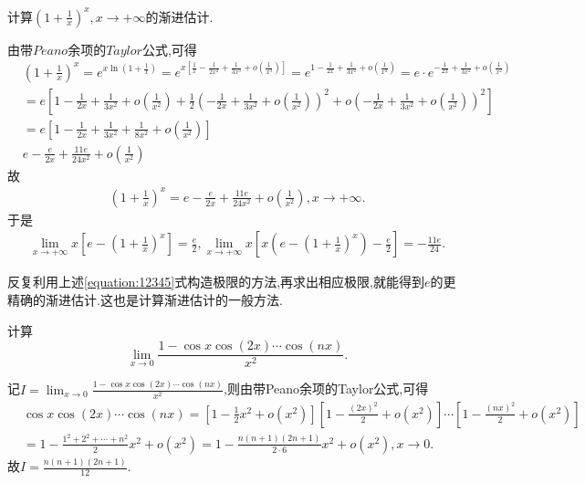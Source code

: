 \documentclass[../../main.tex]{subfiles}
\begin{document}
\begin{example}
计算$(1+\frac{1}{x})^x,x\to+\infty$的渐进估计.
\end{example}
\begin{solution}
由带$Peano$余项的$Taylor$公式,可得
\begin{align*}
&\left( 1+\frac{1}{x} \right) ^x=e^{x\ln \left( 1+\frac{1}{x} \right)}=e^{x\left[ \frac{1}{x}-\frac{1}{2x^2}+\frac{1}{3x^3}+o\left( \frac{1}{x^3} \right) \right]}=e^{1-\frac{1}{2x}+\frac{1}{3x^2}+o\left( \frac{1}{x^2} \right)}=e\cdot e^{-\frac{1}{2x}+\frac{1}{3x^2}+o\left( \frac{1}{x^2} \right)}
\\
&=e\left[ 1-\frac{1}{2x}+\frac{1}{3x^2}+o\left( \frac{1}{x^2} \right) +\frac{1}{2}\left( -\frac{1}{2x}+\frac{1}{3x^2}+o\left( \frac{1}{x^2} \right) \right) ^2+o\left( -\frac{1}{2x}+\frac{1}{3x^2}+o\left( \frac{1}{x^2} \right) \right) ^2 \right] 
\\
&=e\left[ 1-\frac{1}{2x}+\frac{1}{3x^2}+\frac{1}{8x^2}+o\left( \frac{1}{x^2} \right) \right] 
\\
&e-\frac{e}{2x}+\frac{11e}{24x^2}+o\left( \frac{1}{x^2} \right) 
\end{align*}
故\begin{align*}
\left( 1+\frac{1}{x} \right) ^x=e-\frac{e}{2x}+\frac{11e}{24x^2}+o\left( \frac{1}{x^2} \right) ,x\rightarrow +\infty .
\end{align*}
于是
\begin{align}\label{equation:12345}
\underset{x\rightarrow +\infty}{\lim}x\left[ e-\left( 1+\frac{1}{x} \right) ^x \right] =\frac{e}{2},\underset{x\rightarrow +\infty}{\lim}x\left[ x\left( e-\left( 1+\frac{1}{x} \right) ^x \right) -\frac{e}{2} \right] =-\frac{11e}{24}.
\end{align}
\end{solution}
\begin{remark}
反复利用上述\eqref{equation:12345}式构造极限的方法,再求出相应极限,就能得到$e$的更精确的渐进估计.这也是计算渐进估计的一般方法.
\end{remark}

\begin{example}
计算
\[
\lim_{x \to 0} \frac{1 - \cos x \cos(2x) \cdots \cos(nx)}{x^2}.
\]
\end{example}
\begin{solution}
记$I=\lim_{x \to 0} \frac{1 - \cos x \cos(2x) \cdots \cos(nx)}{x^2}$,则由带Peano余项的Taylor公式,可得
\begin{align*}
&\cos x \cos(2x) \cdots \cos(nx)
=\left[1 - \frac{1}{2}x^2 + o(x^2)\right]\left[1 - \frac{(2x)^2}{2} + o(x^2)\right] \cdots \left[1 - \frac{(nx)^2}{2} + o(x^2)\right]
\\
&= 1 - \frac{1^2 + 2^2 + \cdots + n^2}{2}x^2 + o(x^2)
= 1 - \frac{n(n + 1)(2n + 1)}{2 \cdot 6}x^2 + o(x^2),x\to0.
\end{align*}
故\(I = \frac{n(n + 1)(2n + 1)}{12}\).
\end{solution}
\end{document}

